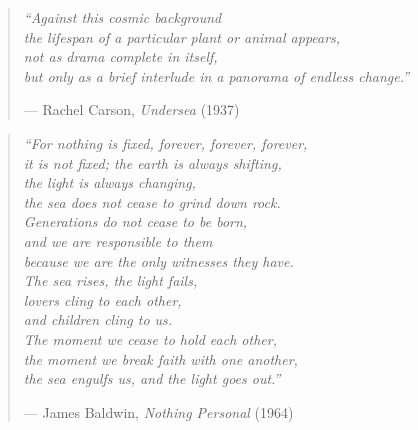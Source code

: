 \documentclass{CSUNthesis}
\begin{document}
\begin{center}
  \vspace*{\fill}

  \begin{minipage}{0.8\textwidth}
    \begin{quote}
      \itshape
      “Against this cosmic background \\ 
       the lifespan of a particular plant or animal appears,\\
       not as drama complete in itself,\\ 
       but only as a brief interlude in a panorama of endless change.”
      \vspace{0.5em}

      {\normalfont — Rachel Carson, \textit{Undersea} (1937)} \hfill
    \end{quote}

    \vspace{2cm}

    \begin{quote}
      \itshape
      “For nothing is fixed, forever, forever, forever,\\
      it is not fixed; the earth is always shifting,\\
      the light is always changing,\\
      the sea does not cease to grind down rock.\\
      Generations do not cease to be born,\\
      and we are responsible to them\\
      because we are the only witnesses they have.\\[1em]
      The sea rises, the light fails,\\
      lovers cling to each other,\\
      and children cling to us.\\
      The moment we cease to hold each other,\\
      the moment we break faith with one another,\\
      the sea engulfs us, and the light goes out.”
      \vspace{0.5em}

      {\normalfont — James Baldwin, \textit{Nothing Personal} (1964)} \hfill
    \end{quote}
  \end{minipage}

  \vspace*{\fill}
\end{center}
\end{document}
